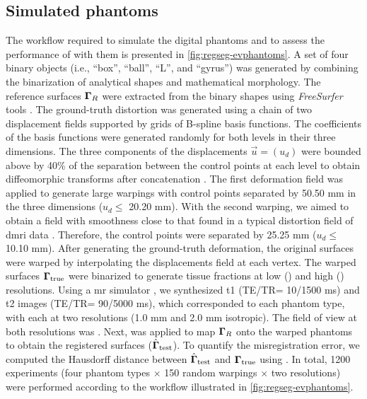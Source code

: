 \subsection{Simulated phantoms}\label{sec:regseg-digital_phantoms}
The workflow required to simulate the digital phantoms and to assess the performance of
  \regseg{} with them is presented in \autoref{fig:regseg-evphantoms}.
A set of four binary objects (i.e., ``box'', ``ball'', ``L'',
  and ``gyrus'') was generated by combining the binarization of
  analytical shapes and mathematical morphology.
The reference surfaces $\boldsymbol{\Gamma}_R$ were extracted from the binary shapes
  using \emph{FreeSurfer} tools \citep{fischl_freesurfer_2012}.
The ground-truth distortion was generated using a chain of two displacement
  fields supported by grids of B-spline basis functions.
The coefficients of the basis functions were generated randomly for
  both levels in their three dimensions.
The three components of the displacements $\vec{u} = (u_d)$
  were bounded above by 40\% of the separation between the control points
  at each level to obtain diffeomorphic transforms
  after concatenation \citep{rueckert_diffeomorphic_2006}.
The first deformation field was applied to generate large warpings
  with control points separated by 50.50 mm in the three dimensions
  ($u_d\leq$ 20.20 mm).
With the second warping, we aimed to obtain a field with smoothness
  close to that found in a typical distortion field of \gls*{dmri} data
  \citep{irfanoglu_susceptibility_2011}.
Therefore, the control points were separated by 25.25 mm ($u_d\leq$ 10.10 mm).
After generating the ground-truth deformation, the original surfaces
  were warped by interpolating the displacements field at each vertex.
The warped surfaces $\boldsymbol{\Gamma}_\text{true}$ were binarized to generate tissue fractions
  at low () and high () resolutions.
Using a \gls*{mr} simulator \citep{caruyer_phantomas_2014}, we synthesized
  \gls*{t1} (TE/TR= 10/1500 ms) and \gls*{t2} images (TE/TR= 90/5000 ms), which
  corresponded to each phantom type, with each at two resolutions
  (1.0 mm and 2.0 mm isotropic).
The field of view at both resolutions was .
Next, \regseg{} was applied to map $\boldsymbol{\Gamma}_R$ onto the warped phantoms to
  obtain the registered surfaces ($\hat{\boldsymbol{\Gamma}}_\text{test}$).
To quantify the misregistration error, we computed the Hausdorff distance between
 $\hat{\boldsymbol{\Gamma}}_\text{test}$ and $\boldsymbol{\Gamma}_\text{true}$ using \citep{commandeur_vtk_2011}.
In total, 1200 experiments (four phantom types $\times$ 150 random warpings $\times$ two resolutions) were
  performed according to the workflow illustrated in \autoref{fig:regseg-evphantoms}.

